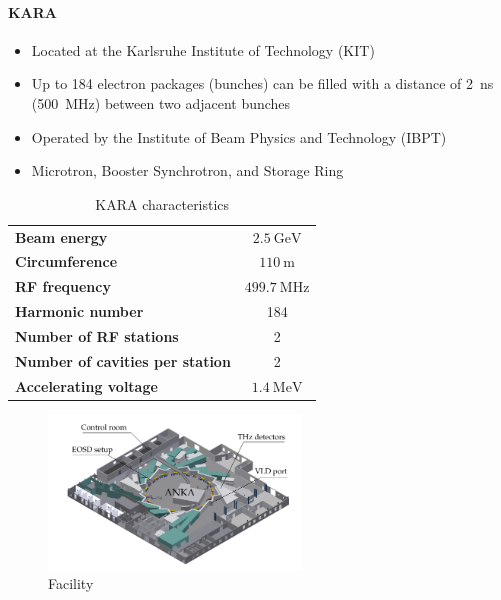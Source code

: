 \paragraph{KARA}
\begin{itemize}[noitemsep]
	\item Located at the Karlsruhe Institute of Technology (KIT)
	\item Up to 184 electron packages (bunches) can be filled with a distance of \SI{2}{\nano \second} (\SI{500}{\mega \hertz}) between two adjacent bunches 
	\item Operated by the Institute of Beam Physics and Technology (IBPT)
	\item Microtron, Booster Synchrotron, and Storage Ring
\end{itemize}

\begin{table}[tbh!]
	\caption{KARA characteristics}
	\label{tab:kara}
	\begin{minipage}{\textwidth}
		\centering
		\begin{tabularx}{\textwidth}{XS}
			\toprule
			\textbf{Beam energy}     				& $ \SI{2.5}{\giga \electronvolt}$ \\
			\textbf{Circumference} 	 				& $\SI{110}{\meter}$	  \\
			\textbf{RF frequency }   				& $\SI{499.7}{\mega \hertz}$ 	\\
			\textbf{Harmonic number} 				& 184	\\
			\textbf{Number of RF stations} 			& 2 \\
			\textbf{Number of cavities per station} 	& 2	\\
			\textbf{Accelerating voltage} 					& $\SI{1.4}{\mega \electronvolt}$ \\
			\bottomrule		\end{tabularx}
	\end{minipage}
\end{table}



\begin{figure}[H]
	\centering
	\includegraphics[width = 0.6\textwidth]{chap/02-theory/img/kara.png}
	\caption{Facility \cite{rota2018}}
	\label{fig:kara}
\end{figure}

